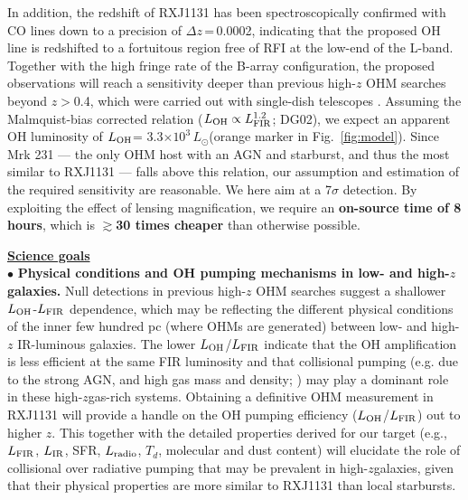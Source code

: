 \documentclass[letterpaper,11pt]{article}
\newcommand{\Lsun}{\mbox{$L_{\odot}$}\xspace}
\newcommand{\LIR}{\mbox{$L_{\rm IR}$}\xspace}
\newcommand{\LFIR}{\mbox{$L_{\rm FIR}$}\xspace}
\newcommand{\LOH}{$L_{\rm OH}$\xspace}
\newcommand{\Fig}[1]{Fig.~\ref{fig:#1}}
\newcommand{\E}[1]{\mbox{$\times10^{#1}$}}
\newcommand{\eq}{\,=\,}
\newcommand{\ssim}{\,$\sim$\,}
\newcommand{\highz}{high-$z$\space}
\newcommand{\obs}{observations\xspace}
\begin{document}
\noindent In addition, the redshift of RXJ1131 has been spectroscopically confirmed with CO lines down to a precision of
$\Delta z$\eq0.0002, indicating that the proposed OH line is redshifted to a fortuitous region
free of RFI at the low-end of the L-band.
Together with the high fringe rate of the B-array configuration, the proposed \obs will
reach a sensitivity deeper than previous high-$z$ OHM searches beyond $z$$>$0.4, which were carried out
with single-dish telescopes \citep[\Fig{model}b; e.g.][]{Darling02a, Willett12a}.
Assuming the Malmquist-bias corrected relation
($L_{\rm OH}\propto L_{\rm FIR}^{1.2}$; DG02), 
we expect an apparent OH luminosity of \LOH= 3.3\E{3}\,\Lsun (orange marker in \Fig{model}).
Since Mrk 231 --- the only OHM host with an AGN and starburst, and thus the most similar to RXJ1131 ---
falls above this relation, our assumption and estimation of the required sensitivity are reasonable.
We here aim at a 7$\sigma$ detection.
By exploiting the effect of lensing magnification, we require an {\bf on-source time of 8 hours}, which
is {\bf $\gtrsim$30 times cheaper}
than otherwise possible.

\noindent \underline{\textbf{Science goals}}
\vspace{.2em}\\
\noindent $\bullet$ {\bf Physical conditions and OH pumping mechanisms in low- and high-$z$ galaxies.}
Null detections in previous high-$z$ OHM searches suggest a shallower \LOH-\LFIR dependence, which may be
reflecting the different physical conditions of the inner few hundred pc (where OHMs are generated)
between low- and high-$z$ IR-luminous galaxies.
The lower \LOH/\LFIR indicate that the OH amplification is less efficient at the same FIR luminosity
and that collisional pumping (e.g. due to the strong AGN, and high gas mass and density; \citealt{Field94a}) %
%
may play a dominant role in these \highz gas-rich systems.
Obtaining a definitive OHM measurement in RXJ1131 will provide a handle on the OH pumping efficiency (\LOH/\LFIR) out to higher $z$.
This together with the detailed properties derived for our target (e.g., \LFIR, \LIR, SFR, $L_{\rm radio}$, $T_{d}$, molecular and dust content)
will elucidate the role of collisional over radiative pumping
that may be prevalent in \highz galaxies, given that their physical properties are more similar to RXJ1131 than
local starbursts. %
\end{document}
